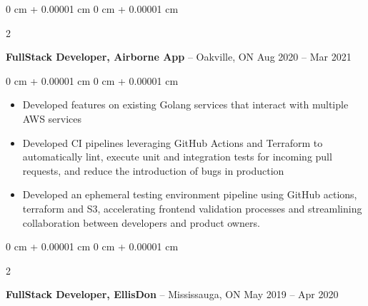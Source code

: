 \documentclass[11pt, letterpaper]{article}
\newenvironment{highlights}{
\begin{itemize}[
topsep=0.10 cm,
parsep=0.10 cm,
partopsep=0pt,
itemsep=0pt,
leftmargin=0 cm + 10pt
]
}{
\end{itemize}
} %
\newenvironment{onecolentry}{
\begin{adjustwidth}{
0 cm + 0.00001 cm
}{
0 cm + 0.00001 cm
}
}{
\end{adjustwidth}
} %
\newenvironment{twocolentry}[2][]{
\onecolentry
\def\secondColumn{#2}
\setcolumnwidth{\fill, 4.5 cm}
\begin{paracol}{2}
}{
\switchcolumn \raggedleft \secondColumn
\end{paracol}
\endonecolentry
} %
\begin{document}
\vspace{0.2 cm}

\begin{twocolentry}{
Aug 2020 – Mar 2021
}
\textbf{FullStack Developer, Airborne App}  -- Oakville, ON\end{twocolentry}

\vspace{0.10 cm}
\begin{onecolentry}
\begin{highlights}
\item Developed features on existing Golang services that interact with multiple AWS services
\item Developed CI pipelines leveraging GitHub Actions and Terraform to automatically lint, execute unit and integration tests for incoming pull requests, and reduce the introduction of bugs in production
\item Developed an ephemeral testing environment pipeline using GitHub actions, terraform and S3, accelerating frontend validation processes and streamlining collaboration between developers and product owners.
\end{highlights}
\end{onecolentry}



\vspace{0.2 cm}

\begin{twocolentry}{
May 2019 – Apr 2020
}
\textbf{FullStack Developer, EllisDon}  -- Mississauga, ON\end{twocolentry}
\end{document}
